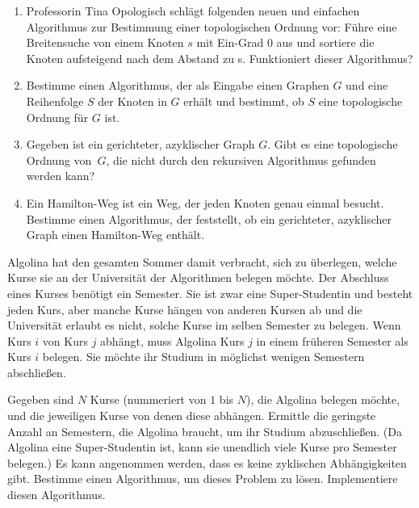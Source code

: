 \documentclass{uebung_cs}
\begin{document}
\begin{aufgabe}\mbox{}
	\begin{enumerate}
		\item \bestehen Professorin Tina Opologisch schlägt folgenden neuen und einfachen Algorithmus zur Bestimmung einer topologischen Ordnung vor: Führe eine Breitensuche von einem Knoten $s$ mit Ein-Grad $0$ aus und sortiere die Knoten aufsteigend nach dem Abstand zu s. Funktioniert dieser Algorithmus?
		\item \bestehen Bestimme einen Algorithmus, der als Eingabe einen Graphen $G$ und eine Reihenfolge $S$ der Knoten in $G$ erhält und bestimmt, ob $S$ eine topologische Ordnung für $G$ ist.
		\item \bestehen Gegeben ist ein gerichteter, azyklischer Graph $G$.
		Gibt es eine topologische Ordnung von~$G$, die nicht durch den rekursiven Algorithmus gefunden werden kann?
		\item \note %
    Ein Hamilton-Weg ist ein Weg, der jeden Knoten genau einmal besucht.
		Bestimme einen Algorithmus, der feststellt, ob ein gerichteter, azyklischer Graph einen Hamilton-Weg enthält.
	\end{enumerate}
\end{aufgabe}

\begin{aufgabe}
Algolina hat den gesamten Sommer damit verbracht, sich zu überlegen, welche Kurse sie an der Universität der Algorithmen belegen möchte.
Der Abschluss eines Kurses benötigt ein Semester. Sie ist zwar eine Super-Studentin und besteht jeden Kurs, aber manche Kurse hängen von anderen Kursen ab und die Universität erlaubt es nicht, solche Kurse im selben Semester zu belegen. Wenn Kurs $i$ von Kurs $j$ abhängt, muss Algolina Kurs $j$ in einem früheren Semester als Kurs $i$ belegen.
Sie möchte ihr Studium in möglichst wenigen Semestern abschließen.

Gegeben sind $N$ Kurse (nummeriert von $1$ bis $N$), die Algolina belegen möchte, und die jeweiligen Kurse von denen diese abhängen.
Ermittle die geringste Anzahl an Semestern, die Algolina braucht, um ihr Studium abzuschließen.
(Da Algolina eine Super-Studentin ist, kann sie unendlich viele Kurse pro Semester belegen.)
Es kann angenommen werden, dass es keine zyklischen Abhängigkeiten gibt.
Bestimme einen Algorithmus, um dieses Problem zu lösen. Implementiere diesen Algorithmus.
\end{aufgabe}
\end{document}
